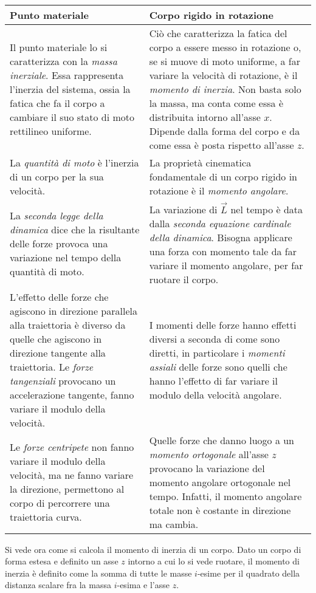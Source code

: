 \begin{table}[H]
	\centering
	\begin{tabular}{|p{6.5cm}|p{6.5cm}|}
		\hline
		Punto materiale & Corpo rigido in rotazione \\
		\hline
		Il punto materiale lo si caratterizza con la \emph{massa inerziale}. Essa rappresenta l'inerzia del sistema, ossia la fatica che fa il corpo a cambiare il suo stato di moto rettilineo uniforme. & Ciò che caratterizza la fatica del corpo a essere messo in rotazione o, se si muove di moto uniforme, a far variare la velocità di rotazione, è il \emph{momento di inerzia}. Non basta solo la massa, ma conta come essa è distribuita intorno all'asse $x$. Dipende dalla forma del corpo e da come essa è posta rispetto all'asse $z$. \\
		\hline
		La \emph{quantità di moto} è l'inerzia di un corpo per la sua velocità. & La proprietà cinematica fondamentale di un corpo rigido in rotazione è il \emph{momento angolare}.\\
		\hline
		La \emph{seconda legge della dinamica} dice che la risultante delle forze provoca una variazione nel tempo della quantità di moto. & La variazione di $\vec{L}$ nel tempo è data dalla \emph{seconda equazione cardinale della dinamica}. Bisogna applicare una forza con momento tale da far variare il momento angolare, per far ruotare il corpo.\\
		\hline
		L'effetto delle forze che agiscono in direzione parallela alla traiettoria è diverso da quelle che agiscono in direzione tangente alla traiettoria. Le \emph{forze tangenziali} provocano un accelerazione tangente, fanno variare il modulo della velocità. & I momenti delle forze hanno effetti diversi a seconda di come sono diretti, in particolare i \emph{momenti assiali} delle forze sono quelli che hanno l'effetto di far variare il modulo della velocità angolare. \\
		\hline
		Le \emph{forze centripete} non fanno variare il modulo della velocità, ma ne fanno variare la direzione, permettono al corpo di percorrere una traiettoria curva. & Quelle forze che danno luogo a un \emph{momento ortogonale} all'asse $z$ provocano la variazione del momento angolare ortogonale nel tempo. Infatti, il momento angolare totale non è costante in direzione ma cambia.\\
		\hline
	\end{tabular}
\end{table}

Si vede ora come si calcola il momento di inerzia di un corpo.  Dato un corpo di forma estesa e definito un asse $z$ intorno a cui lo si vede ruotare, il momento di inerzia è definito come la somma di tutte le masse $i$-esime per il quadrato della distanza scalare fra la massa $i$-esima e l'asse $z$.

